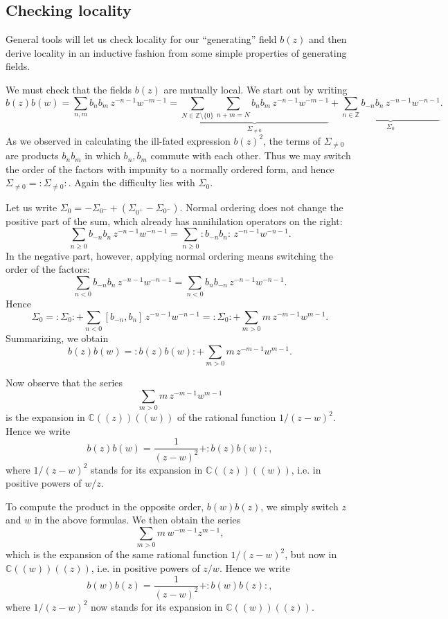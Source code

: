 \documentclass[12pt]{article}
\begin{document}
\subsection{Checking locality}
General tools will let us check locality for our “generating” field $b(z)$ and then derive locality in an inductive fashion from some simple properties of generating fields.

We must check that the fields $b(z)$ are mutually local. We start out by writing
\[
b(z)b(w)
= \sum_{n,m} b_n b_m\, z^{-n-1} w^{-m-1}
= \underbrace{\sum_{N\in\mathbb{Z}\setminus\{0\}} \sum_{n+m=N} b_n b_m\,z^{-n-1}w^{-m-1}}_{\Sigma_{\neq 0}}
+ \underbrace{\sum_{n\in\mathbb{Z}} b_{-n}b_n\,z^{-n-1}w^{-n-1}}_{\Sigma_0}.
\]
As we observed in calculating the ill-fated expression \(b(z)^2\), 
the terms of \(\Sigma_{\neq 0}\) are products \(b_n b_m\) in which \(b_n,b_m\) commute with each other.  
Thus we may switch the order of the factors with impunity to a normally ordered form, 
and hence \(\Sigma_{\neq 0} = :\Sigma_{\neq 0}:\).  
Again the difficulty lies with \(\Sigma_0\).

Let us write \(\Sigma_0 = -\Sigma_{0^-} + (\Sigma_{0^+} - \Sigma_{0^-})\).  
Normal ordering does not change the positive part of the sum, 
which already has annihilation operators on the right:
\[
\sum_{n\ge 0} b_{-n}b_n\,z^{-n-1}w^{-n-1}
= \sum_{n\ge 0} :b_{-n}b_n:\,z^{-n-1}w^{-n-1}.
\]
In the negative part, however, applying normal ordering means switching the order of the factors:
\[
\sum_{n<0} b_{-n}b_n\,z^{-n-1}w^{-n-1}
= \sum_{n<0} b_n b_{-n}\,z^{-n-1}w^{-n-1}.
\]
Hence
\[
\Sigma_0
= :\Sigma_0: + \sum_{n<0} [b_{-n},b_n]\,z^{-n-1}w^{-n-1}
= :\Sigma_0: + \sum_{m>0} m\,z^{-m-1}w^{m-1}.
\]
Summarizing, we obtain
\[
b(z)b(w)
= :b(z)b(w): + \sum_{m>0} m\,z^{-m-1}w^{m-1}.
\]

Now observe that the series
\begin{equation}\label{2.3.1}
\sum_{m>0} m\,z^{-m-1}w^{m-1}
\end{equation}
is the expansion in \(\mathbb{C}((z))((w))\) of the rational function \(1/(z-w)^2\).  
Hence we write
\begin{equation}\label{2.3.2}
b(z)b(w)
= \frac{1}{(z-w)^2} + :b(z)b(w):,
\end{equation}
where \(1/(z-w)^2\) stands for its expansion in \(\mathbb{C}((z))((w))\), 
i.e. in positive powers of \(w/z\).

To compute the product in the opposite order, \(b(w)b(z)\), 
we simply switch \(z\) and \(w\) in the above formulas.  
We then obtain the series
\begin{equation}\label{2.3.3}
\sum_{m>0} m\,w^{-m-1}z^{m-1},
\end{equation}
which is the expansion of the same rational function \(1/(z-w)^2\), 
but now in \(\mathbb{C}((w))((z))\), i.e. in positive powers of \(z/w\).  
Hence we write
\begin{equation}\label{2.3.4}
b(w)b(z)
= \frac{1}{(z-w)^2} + :b(w)b(z):,
\end{equation}
where \(1/(z-w)^2\) now stands for its expansion in \(\mathbb{C}((w))((z))\).
\end{document}
